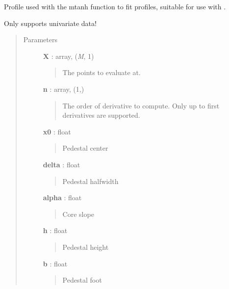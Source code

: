 \documentclass[letterpaper,10pt,english]{sphinxmanual}
\begin{document}

\begin{fulllineitems}
\label{gptools:gptools.mean.mtanh_profile}
Profile used with the mtanh function to fit profiles, suitable for use with {\hyperref[gptools:gptools.mean.MeanFunction]{}}.

Only supports univariate data!
\begin{quote}\begin{description}
\item[{Parameters}] \leavevmode
\textbf{X} : array, (\emph{M}, 1)
\begin{quote}

The points to evaluate at.
\end{quote}

\textbf{n} : array, (1,)
\begin{quote}

The order of derivative to compute. Only up to first derivatives are
supported.
\end{quote}

\textbf{x0} : float
\begin{quote}

Pedestal center
\end{quote}

\textbf{delta} : float
\begin{quote}

Pedestal halfwidth
\end{quote}

\textbf{alpha} : float
\begin{quote}

Core slope
\end{quote}

\textbf{h} : float
\begin{quote}

Pedestal height
\end{quote}

\textbf{b} : float
\begin{quote}

Pedestal foot
\end{quote}

\end{description}\end{quote}

\end{fulllineitems}
\end{document}
